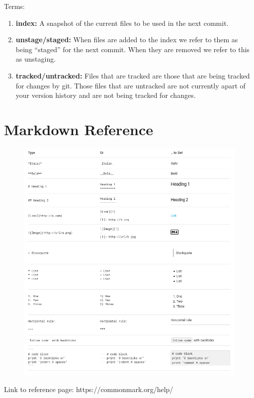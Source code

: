 \documentclass[a4paper,10pt]{article} %
\begin{document}
Terms:
\begin{enumerate}
  \item \textbf{index: } A snapshot of the current files to be used in the next commit.
  \item \textbf{unstage/staged: } When files are added to the index we refer to them as being ``staged'' for the next commit. When they are removed we refer to this as unstaging.
  \item \textbf{tracked/untracked: } Files that are tracked are those that are being tracked for changes by git. Those files that are untracked are not currently apart of your version history and are not being tracked for changes.
\end{enumerate}


\section{Markdown Reference}

\begin{figure}[H]
  \includegraphics[width=\textwidth]{./imgs/markdown.png}
\end{figure}

Link to reference page: https://commonmark.org/help/
\end{document}
